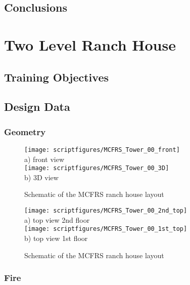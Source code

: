 \documentclass[11pt]{book}
\begin{document}
\section{Conclusions}


\chapter{Two Level Ranch House}

\section{Training Objectives}

\section{Design Data}
\subsection{Geometry}

\begin{figure}[\figoptions]
\begin{center}
\texttt{[image: scriptfigures/MCFRS\_Tower\_00\_front]}\\
a) front view\\
\texttt{[image: scriptfigures/MCFRS\_Tower\_00\_3D]}\\
b) 3D view\\
\end{center}
\caption{Schematic of the MCFRS ranch house layout}
\label{figflashoverplan}%
\end{figure}

\begin{figure}[\figoptions]
\begin{center}
\texttt{[image: scriptfigures/MCFRS\_Tower\_00\_2nd\_top]}\\
a) top view 2nd floor\\
\texttt{[image: scriptfigures/MCFRS\_Tower\_00\_1st\_top]}\\
b) top view 1st floor\\
\end{center}
\caption{Schematic of the MCFRS ranch house layout}
\label{figflashoverplan}%
\end{figure}

\subsection{Fire}
\end{document}
